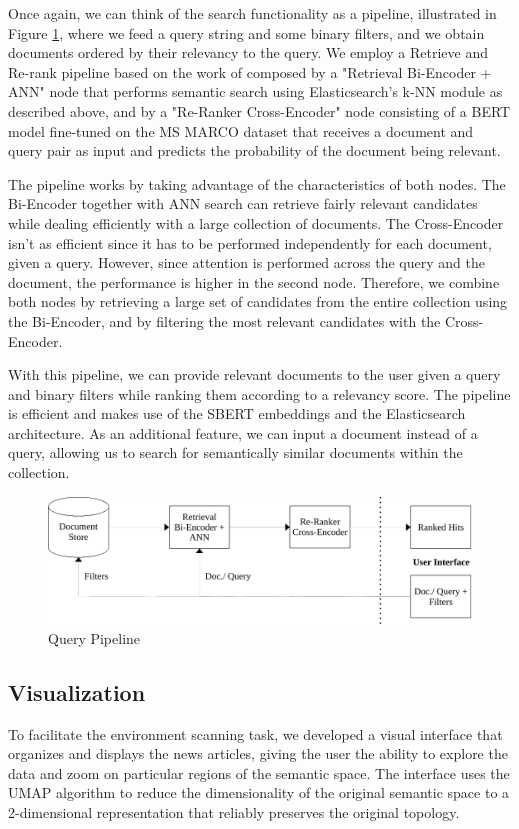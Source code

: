 \documentclass[a4paper]{article}
\begin{document}
Once again, we can think of the search functionality as a pipeline, illustrated in Figure \ref{query_pipeline}, where we feed a query string and some binary filters, and we obtain documents ordered by their relevancy to the query. We employ a Retrieve and Re-rank pipeline based on the work of \citet{nogueira2020a, kratzwald2019} composed by a "Retrieval Bi-Encoder + ANN" node that performs semantic search using Elasticsearch’s k-NN module as described above, and by a "Re-Ranker Cross-Encoder" node consisting of a BERT \citep{devlin2019} model fine-tuned on the MS MARCO dataset that receives a document and query pair as input and predicts the probability of the document being relevant. 

The pipeline works by taking advantage of the characteristics of both nodes. The Bi-Encoder together with ANN search can retrieve fairly relevant candidates while dealing efficiently with a large collection of documents. The Cross-Encoder isn't as efficient since it has to be performed independently for each document, given a query. However, since attention is performed across the query and the document, the performance is higher in the second node. Therefore, we combine both nodes by retrieving a large set of candidates from the entire collection using the Bi-Encoder, and by filtering the most relevant candidates with the Cross-Encoder.

With this pipeline, we can provide relevant documents to the user given a query and binary filters while ranking them according to a relevancy score. The pipeline is efficient and makes use of the SBERT embeddings and the Elasticsearch architecture. As an additional feature, we can input a document instead of a query, allowing us to search for semantically similar documents within the collection.

\begin{figure}[H]
	\centering
	\includegraphics[scale=0.7]{./figures/query_pipeline}
	\caption{Query Pipeline}
	\label{query_pipeline}
\end{figure}

\subsection*{Visualization}
To facilitate the environment scanning task, we developed a visual interface that organizes and displays the news articles, giving the user the ability to explore the data and zoom on particular regions of the semantic space. The interface uses the UMAP \citep{mcinnes2020} algorithm to reduce the dimensionality of the original semantic space to a 2-dimensional representation that reliably preserves the original topology.
\end{document}
